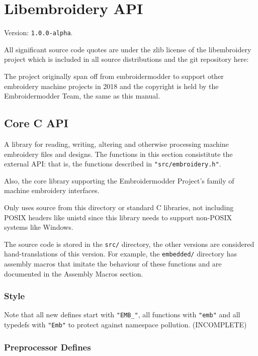 \chapter{Libembroidery API}

Version: \texttt{1.0.0-alpha}.

All significant source code quotes are under the zlib license of the
libembroidery project which is included in all source distributions and the
git repository here: %

The project originally span off from embroidermodder to support other embroidery
machine projects in 2018 and the copyright is held by the Embroidermodder Team,
the same as this manual.

\section{Core C API}

A library for reading, writing, altering and otherwise
processing machine embroidery files and designs. The functions in this section
consistitute the external API: that is, the functions described in
\texttt{"src/embroidery.h"}.

Also, the core library supporting the Embroidermodder Project's
family of machine embroidery interfaces.

Only uses source from this directory or standard C libraries,
not including POSIX headers like unistd since this library
needs to support non-POSIX systems like Windows.

The source code is stored in the \texttt{src/} directory, the other
versions are considered hand-translations of this version. For example,
the \texttt{embedded/} directory has assembly macros that imitate the behaviour
of these functions and are documented in the Assembly Macros section.

\subsection{Style}

Note that all new defines start with \texttt{"EMB\_"}, all functions with
\texttt{"emb"} and all
typedefs with \texttt{"Emb"} to protect against namespace pollution.
(INCOMPLETE)

\subsection{Preprocessor Defines}

